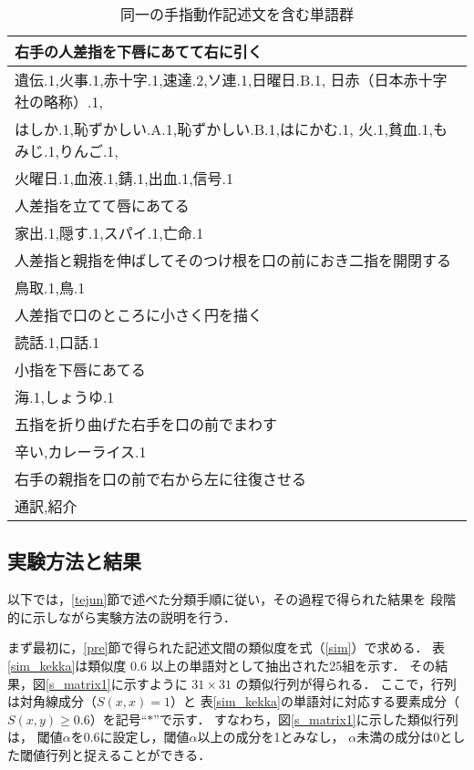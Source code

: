 \begin{table}[htb]
\caption{同一の手指動作記述文を含む単語群}
\label{marge}
\tabcolsep=3pt\footnotesize
\begin{center}
\begin{tabular}{|l|}\hline
右手の人差指を下唇にあてて右に引く\\ \hline
遺伝.1,火事.1,赤十字.1,速達.2,ソ連.1,日曜日.B.1,
日赤（日本赤十字社の略称）.1,\\
はしか.1,恥ずかしい.A.1,恥ずかしい.B.1,はにかむ.1,
火.1,貧血.1,もみじ.1,りんご.1,\\
火曜日.1,血液.1,錆.1,出血.1,信号.1\\ \hline
人差指を立てて唇にあてる\\ \hline
家出.1,隠す.1,スパイ.1,亡命.1\\ \hline
人差指と親指を伸ばしてそのつけ根を口の前におき二指を開閉する\\ \hline
鳥取.1,鳥.1\\ \hline
人差指で口のところに小さく円を描く\\ \hline
読話.1,口話.1\\ \hline
小指を下唇にあてる\\ \hline
海.1,しょうゆ.1\\ \hline
五指を折り曲げた右手を口の前でまわす\\ \hline
辛い,カレーライス.1\\ \hline
右手の親指を口の前で右から左に往復させる\\ \hline
通訳,紹介\\ \hline
\end{tabular}
\end{center}
\end{table}


\subsection{実験方法と結果}

以下では，\ref{tejun}節で述べた分類手順に従い，その過程で得られた結果を
段階的に示しながら実験方法の説明を行う．

まず最初に，\ref{pre}節で得られた記述文間の類似度を式（\ref{sim}）で求める．
表\ref{sim_kekka}は類似度 $0.6$ 以上の単語対として抽出された25組を示す．
その結果，図\ref{s_matrix1}に示すように $31\times 31$ の類似行列が得られる．
ここで，行列は対角線成分（$S(x,x)=1$）と
表\ref{sim_kekka}の単語対に対応する要素成分（$S(x,y)\ge 0.6$）を記号``$\ast$''で示す．
すなわち，図\ref{s_matrix1}に示した類似行列は，
閾値$\alpha$を$0.6$に設定し，閾値$\alpha$以上の成分を1とみなし，
$\alpha$未満の成分は0とした閾値行列と捉えることができる．


